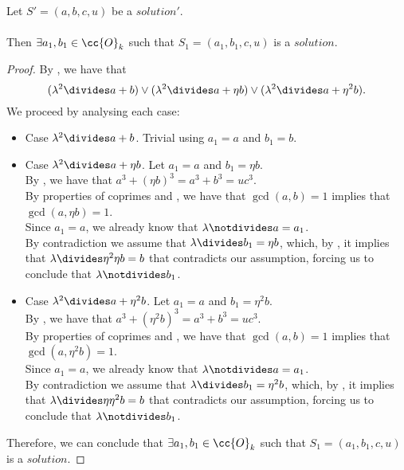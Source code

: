 \begin{lemma}
  \label{lmm:ex_dvd_a_add_b}
  \leanok
  Let $S'=(a, b, c, u)$ be a $solution'$.\\\\
  Then $\exists a_1,b_1 \in \cc{O}_k$ such that $S_1=(a_1,b_1,c,u)$ is a $solution$.
\end{lemma}
\begin{proof}
  \leanok
  By , we have that
  $$(\lambda^2 \divides a + b) \lor (\lambda^2 \divides a +
  \eta b) \lor (\lambda^2 \divides a + \eta^2 b).$$
  We proceed by analysing each case:
  \begin{itemize}
      \item Case $\lambda^2 \divides a + b$. Trivial using $a_1=a$ and $b_1=b$.
      \item Case $\lambda^2 \divides a + \eta b$. Let $a_1=a$ and $b_1=\eta b$. \\
      By , we have that $a^3 + (\eta b)^3 = a^3 + b^3 = u c^3$.\\
      By properties of coprimes and , we have that
      $\gcd(a,b)=1$ implies that $\gcd(a,\eta b)=1$.\\
      Since $a_1=a$, we already know that $\lambda \notdivides a = a_1$.\\
      By contradiction we assume that $\lambda \divides b_1 = \eta b$, which,
      by , it implies that $\lambda \divides \eta^2 \eta b = b$
      that contradicts our assumption, forcing us to conclude that $\lambda \notdivides b_1$.
      \item Case $\lambda^2 \divides a + \eta^2 b$. Let $a_1=a$ and $b_1=\eta^2 b$. \\
      By , we have that $a^3 + (\eta^2 b)^3 = a^3 + b^3 = u c^3$.\\
      By properties of coprimes and , we have that
      $\gcd(a,b)=1$ implies that $\gcd(a,\eta^2 b)=1$.\\
      Since $a_1=a$, we already know that $\lambda \notdivides a = a_1$.\\
      By contradiction we assume that $\lambda \divides b_1 = \eta^2 b$, which,
      by , it implies that $\lambda \divides \eta \eta^2 b = b$
      that contradicts our assumption, forcing us to conclude that $\lambda \notdivides b_1$.
  \end{itemize}
  Therefore, we can conclude that
  $\exists a_1,b_1 \in \cc{O}_k$ such that $S_1=(a_1,b_1,c,u)$ is a $solution$.
\end{proof}

